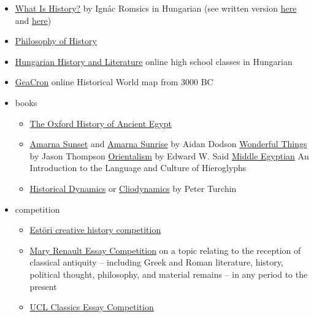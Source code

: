 \documentclass{article}
\begin{document}
\begin{itemize}
    \item \href{https://mindentudas.videotorium.hu/hu/recordings/8176/mi-a-tortenelem}{What Is History?} by Ignác Romsics in Hungarian (see written version \href{http://real-eod.mtak.hu/1022/1/04\%20Romsics\%20Ign\%C3\%A1c.pdf}{here} and \href{https://mindentudas.hu/el\%C5\%91ad\%C3\%A1sok/tudom\%C3\%A1nyter\%C3\%BCletek/b\%C3\%B6lcs\%C3\%A9szettudom\%C3\%A1ny/138-t\%C3\%B6rt\%C3\%A9nelemtudom\%C3\%A1nyok/6059-a-toertenetiro-dilemmaja-megismerjuek-vagy-csinaljuk-e-a-toertenelmet.html}{here})
    \item \href{https://www.britannica.com/topic/philosophy-of-history}{Philosophy of History}
    \item \href{https://www.youtube.com/channel/UCMFOiJn5wGreCszxZ9xuyTg/playlists}{Hungarian History and Literature} online high school classes in Hungarian
    \item \href{http://geacron.com/home-en/}{GeaCron} online Historical World map from 3000 BC
    \item books
    \begin{itemize}
        \item \href{https://www.goodreads.com/book/show/139310.The_Oxford_History_of_Ancient_Egypt}{The Oxford History of Ancient Egypt}
        \item \href{https://www.goodreads.com/book/show/6476537-amarna-sunset}{Amarna Sunset} and \href{https://www.goodreads.com/book/show/18798554-amarna-sunrise}{Amarna Sunrise} by Aidan Dodson
        \href{https://aucpress.com/product/wonderful-things/}{Wonderful Things} by Jason Thompson
        \href{https://www.goodreads.com/en/book/show/355190.Orientalism}{Orientalism} by Edward W. Said
        \href{https://www.cambridge.org/core/books/middle-egyptian/831CD0936A9DC45988F94B74C598353E}{Middle Egyptian} An Introduction to the Language and Culture of Hieroglyphs
        
        \item \href{https://www.goodreads.com/en/book/show/480002.Historical_Dynamics}{Historical Dynamics} or \href{https://www.nature.com/articles/488024a}{Cliodynamics} by Peter Turchin
    \end{itemize}
    \item competition
    \begin{itemize}
        \item \href{https://www.estori.hu/}{Estöri creative history competition}
        \item \href{https://www.st-hughs.ox.ac.uk/prospective-students/outreach-at-st-hughs/the-mary-renault-prize/}{Mary Renault Essay Competition} on a topic relating to the reception of classical antiquity – including Greek and Roman literature, history, political thought, philosophy, and material remains – in any period to the present
        \item \href{https://www.ucl.ac.uk/classics/outreach/essay-competition}{UCL Classics Essay Competition}
    \end{itemize}
\end{itemize}
\end{document}
